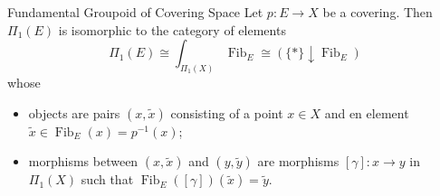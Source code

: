 \documentclass{report}
\begin{document}
\begin{proposition}{Fundamental Groupoid of Covering Space}{}
Let $p:E \to X$ be a covering. Then $\Pi_1(E)$ is isomorphic to the category of elements 
$$
\Pi_1(E) \cong \int_{\Pi_1(X)} \operatorname{Fib}_E\cong  \left(\{*\} \downarrow \operatorname{Fib}_E\right)
$$
whose
\begin{itemize}
	\item objects are pairs $(x, \widetilde{x})$ consisting of a point $x \in X$ and en element $\widetilde{x} \in \operatorname{Fib}_E(x)=p^{-1}(x)$;
	\item morphisms between $(x, \widetilde{x})$ and $\left(y, \widetilde{y}\right)$ are morphisms $[\gamma]: x \rightarrow y$ in $\Pi_1(X)$ such that $\operatorname{Fib}_E([\gamma])(\widetilde{x})=\widetilde{y}$.
\end{itemize}
\end{proposition}
\end{document}
